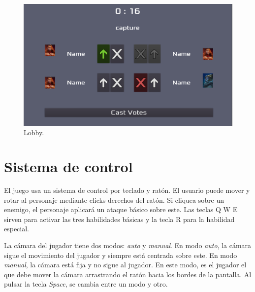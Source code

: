 \begin{figure}[h!]
	\centering
	\includegraphics[width=0.7\linewidth]{figures/Lobby}
	\caption{Lobby.}
	\label{fig:Lobby}
\end{figure}


\section{Sistema de control}
El juego usa un sistema de control por teclado y ratón. El usuario puede mover y rotar al personaje mediante clicks derechos del ratón. Si cliquea sobre un enemigo, el personaje aplicará un ataque básico sobre este.
Las teclas Q W E sirven para activar las tres habilidades básicas y la tecla R para la habilidad especial.

\vspace{\baselineskip}

La cámara del jugador tiene dos modos: \emph{auto} y \emph{manual}. En modo \emph{auto}, la cámara sigue el movimiento del jugador y siempre está centrada sobre este. En modo \emph{manual}, la cámara está fija y no sigue al jugador. En este modo, es el jugador el que debe mover la cámara arrastrando el ratón hacia los bordes de la pantalla. Al pulsar la tecla \emph{Space}, se cambia entre un modo y otro.